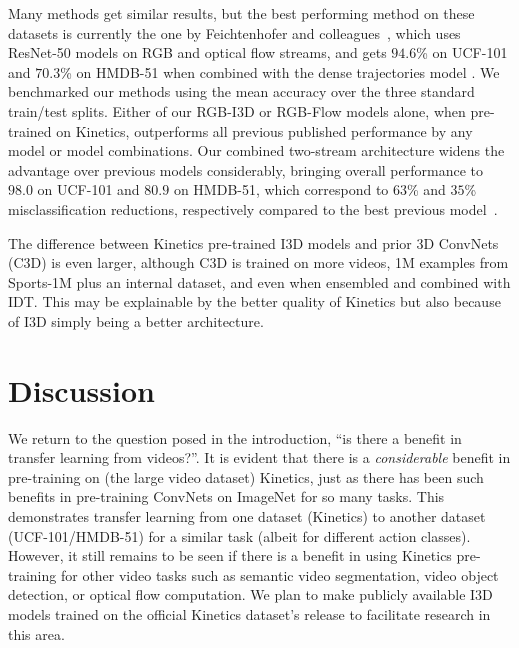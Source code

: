 \documentclass[10pt,twocolumn,letterpaper]{article}
\begin{document}
Many methods get similar results, but the best performing method on these datasets is
currently the one by Feichtenhofer and colleagues~\cite{feichtenhofer2016spatiotemporal}, which uses ResNet-50 models on RGB and optical flow streams, and  gets $94.6$\% on UCF-101 and $70.3$\% on HMDB-51 when combined with the dense trajectories model \cite{wangICCV13}. We
benchmarked our methods using the mean accuracy over the three standard train/test splits. Either of our RGB-I3D or RGB-Flow models alone, when pre-trained on Kinetics, outperforms all previous published performance by any model or model combinations. Our combined two-stream architecture widens the advantage over previous models considerably, bringing overall performance to $98.0$ on UCF-101 and $80.9$ on HMDB-51, which correspond to $63$\% and $35$\% misclassification reductions, respectively compared to the best previous model~\cite{feichtenhofer2016spatiotemporal}.

The difference between Kinetics pre-trained I3D models and prior 3D ConvNets (C3D) is even larger, although C3D is trained on more videos, 1M examples from Sports-1M plus an internal dataset, and even when ensembled and combined with IDT. This may be explainable by the better quality of Kinetics but also because of I3D simply being a better architecture.


\section{Discussion}

We return to the question posed in the introduction, ``is there a
benefit in transfer learning from videos?''.  It is evident that there is a {\em
considerable} benefit in pre-training on (the large video dataset) Kinetics, just as there has been such benefits in pre-training ConvNets on ImageNet for so many tasks. This demonstrates transfer learning from one dataset (Kinetics) to another dataset (UCF-101/HMDB-51) for a similar task (albeit for different action classes). However, it still remains to be seen if there is a benefit in using Kinetics pre-training for other video tasks such as semantic video segmentation, video object detection, or optical flow computation. We plan to make publicly available I3D models trained on the official Kinetics dataset's release to facilitate research in this area. 
\end{document}
